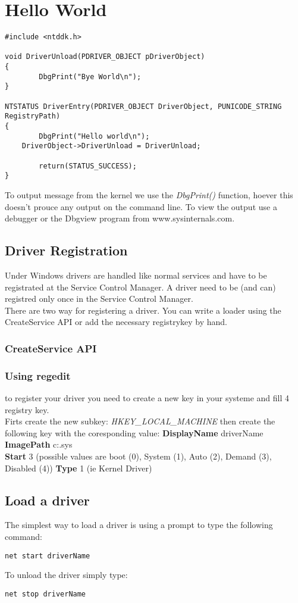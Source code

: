 \documentclass[a4paper,10pt]{article}
\begin{document}
\section{Hello World}
\begin{lstlisting}
#include <ntddk.h>

void DriverUnload(PDRIVER_OBJECT pDriverObject)
{
        DbgPrint("Bye World\n");
}

NTSTATUS DriverEntry(PDRIVER_OBJECT DriverObject, PUNICODE_STRING RegistryPath)
{
        DbgPrint("Hello world\n");
	DriverObject->DriverUnload = DriverUnload;

        return(STATUS_SUCCESS);
}
\end{lstlisting}

To output message from the kernel we use the {\it DbgPrint()} function, hoever
this doesn't prouce any output on the command line. To view the output use a
debugger or the Dbgview program from www.sysinternals.com.

\subsection{Driver Registration}
Under Windows drivers are handled like normal services and have to be
registrated at the Service Control Manager. A driver need to be (and can)
registred only once in the Service Control Manager.\\
There are two way for registering a driver. You can write a loader using the
CreateService API or add the necessary registrykey by hand.
\subsubsection{CreateService API}
\subsubsection{Using regedit}
to register your driver you need to create a new key in your systeme and fill
4 registry key.\\
Firts create the new subkey: {\it
HKEY\_LOCAL\_MACHINE\textbackslashSystem\textbackslashCurrentControlSet\textbackslashServices\textbackslashdriverName}
then create the following key with the coresponding value:
{\bf DisplayName} driverName\\
{\bf ImagePath} c:\textbackslashpath\textbackslashto\textbackslashdriver\textbackslashdriverName.sys\\
{\bf Start} 3 (possible values are boot (0),  System (1), Auto (2), Demand
(3), Disabled (4))
{\bf Type} 1 (ie Kernel Driver)
\subsection{Load a driver}
The simplest way to load a driver is using a prompt to type the following
command:
\begin{lstlisting}
net start driverName
\end{lstlisting}
To unload the driver simply type:
\begin{lstlisting}
net stop driverName
\end{lstlisting}
\end{document}
